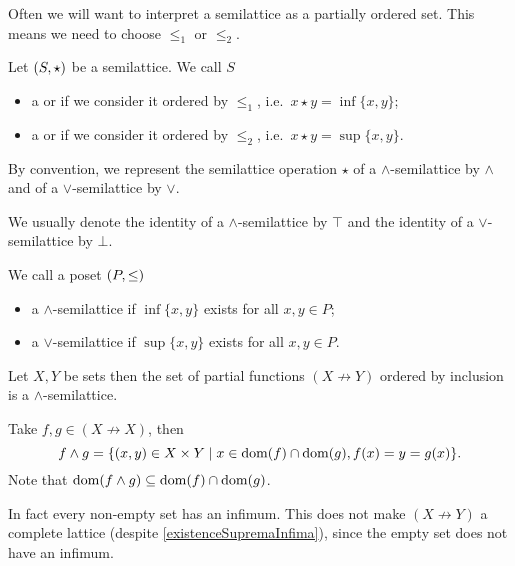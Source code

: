 Often we will want to interpret a semilattice as a partially ordered set. This means we need to choose $\leq_1$ or $\leq_2$.
\begin{definition}
Let $\sSet{S,\star}$ be a semilattice. We call $S$
\begin{itemize}
\item a  or  if we consider it ordered by $\leq_1$, i.e.\ $x\star y = \inf\{x,y\}$;
\item a  or  if we consider it ordered by $\leq_2$, i.e.\ $x\star y = \sup\{x,y\}$.
\end{itemize}
By convention, we represent the semilattice operation $\star$ of a $\wedge$-semilattice by $\wedge$ and of a $\vee$-semilattice by $\vee$.

We usually denote the identity of a $\wedge$-semilattice by $\top$ and the identity of a $\vee$-semilattice by $\bot$.
\end{definition}

We call a poset $\sSet{P,\leq}$
\begin{itemize}
\item a $\wedge$-semilattice if $\inf\{x,y\}$ exists for all $x,y\in P$;
\item a $\vee$-semilattice if $\sup\{x,y\}$ exists for all $x,y\in P$.
\end{itemize}

\begin{example}
Let $X,Y$ be sets then the set of partial functions $(X\not\to Y)$ ordered by inclusion is a $\wedge$-semilattice.

Take $f,g\in (X\not\to X)$, then
\[ f\wedge g = \setbuilder{(x,y)\in X\times Y}{x\in \dom(f)\cap \dom(g), f(x)=y=g(x)}. \]
Note that $\operatorname{dom}(f\wedge g) \subseteq \operatorname{dom}(f)\cap \operatorname{dom}(g)$.

In fact every non-empty set has an infimum. This does not make $(X\not\to Y)$ a complete lattice (despite \ref{existenceSupremaInfima}), since the empty set does not have an infimum.
\end{example}

